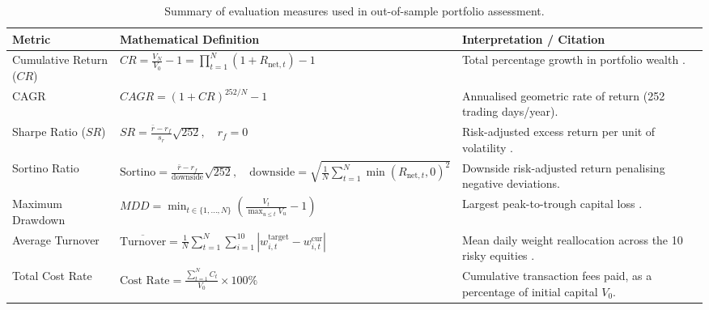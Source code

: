\begin{table}[htbp]
\centering
\small
\renewcommand{\arraystretch}{1.18}
\setlength{\tabcolsep}{4.5pt}
\caption{Summary of evaluation measures used in out-of-sample portfolio assessment.}
\label{tab:eval_measures}
\begin{tabularx}{\textwidth}{p{2.6cm}p{5.5cm}>{\raggedright\arraybackslash}X}
\toprule
\textbf{Metric} & \textbf{Mathematical Definition} & \textbf{Interpretation / Citation} \\
\midrule
Cumulative Return ($CR$) & $CR = \frac{V_N}{V_0} - 1 = \prod_{t=1}^N (1 + R_{\text{net},t}) - 1$ & Total percentage growth in portfolio wealth \citep{zou2024novel}. \\
CAGR & $CAGR = (1 + CR)^{252 / N} - 1$ & Annualised geometric rate of return (252 trading days/year). \\
Sharpe Ratio ($SR$) & $SR = \frac{\bar{r} - r_f}{s_r} \sqrt{252}, \quad r_f = 0$ & Risk-adjusted excess return per unit of volatility \citep{millea2021deep}. \\
Sortino Ratio & $\text{Sortino} = \frac{\bar{r} - r_f}{\text{downside}} \sqrt{252}, \quad \text{downside} = \sqrt{\frac{1}{N} \sum_{t=1}^N \min(R_{\text{net},t}, 0)^2}$ & Downside risk-adjusted return penalising negative deviations. \\
Maximum Drawdown & $MDD = \min_{t \in \{1,\dots,N\}} \left( \frac{V_t}{\max_{u \le t} V_u} - 1 \right)$ & Largest peak-to-trough capital loss \citep{zou2024novel}. \\
Average Turnover & $\overline{\text{Turnover}} = \frac{1}{N} \sum_{t=1}^N \sum_{i=1}^{10} |w_{i,t}^{\text{target}} - w_{i,t}^{\text{cur}}|$ & Mean daily weight reallocation across the 10 risky equities \citep{wang2025risk}. \\
Total Cost Rate & $\text{Cost Rate} = \frac{\sum_{t=1}^N C_t}{V_0} \times 100\%$ & Cumulative transaction fees paid, as a percentage of initial capital $V_0$. \\
\bottomrule
\end{tabularx}
\end{table}
